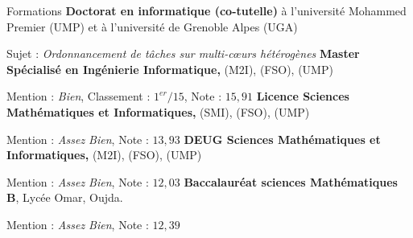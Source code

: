 \begin{rubric}{Formations}
\entry*[$2015$ -- $2018$]%
    \textbf{Doctorat en informatique (co-tutelle)} à l'université Mohammed Premier (UMP) et à l'université de Grenoble Alpes (UGA)
	\par Sujet : \emph{Ordonnancement de tâches sur multi-cœurs hétérogènes}
%
\entry*[$2014$]%
	\textbf{Master Spécialisé en Ingénierie Informatique,} (M2I), (FSO), (UMP)\par
	Mention : \emph{Bien}, Classement : $1^{er}/15$, Note : $15,91$ 
%
\entry*[$2012$]%
	\textbf{Licence Sciences Mathématiques et Informatiques,} (SMI), (FSO), (UMP) \par
	Mention : \emph{Assez Bien}, Note :  $13,93$
%
\entry*[$2011$]%
	\textbf{DEUG Sciences Mathématiques et Informatiques,} (M$2$I), (FSO), (UMP)\par
	Mention : \emph{Assez Bien}, Note : $12,03$
%
\entry*[$2008$]%
	\textbf{Baccalauréat sciences Mathématiques B}, Lycée Omar, Oujda.\par
	Mention : \emph{Assez Bien}, Note : $12,39$
%
\end{rubric}
